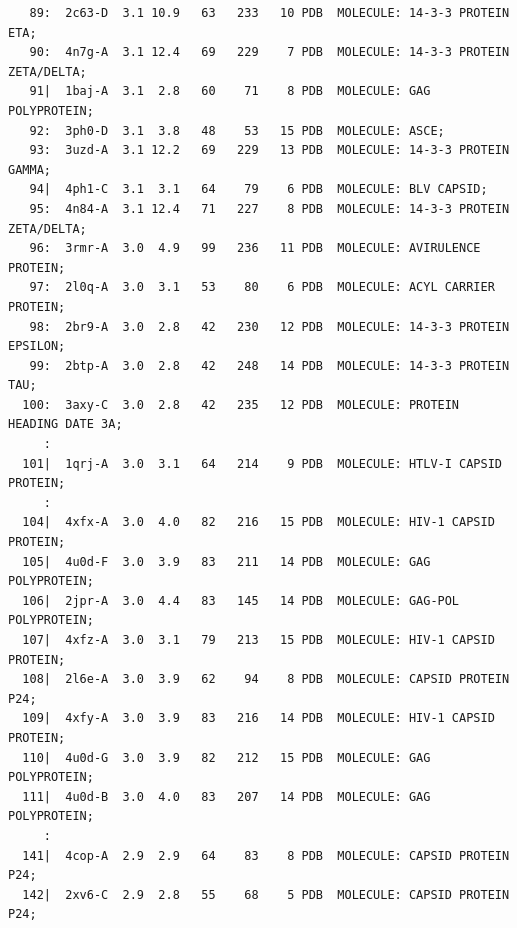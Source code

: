 \documentclass{bmcart}
\begin{document}
\begin{verbatim}
   89:  2c63-D  3.1 10.9   63   233   10 PDB  MOLECULE: 14-3-3 PROTEIN ETA;                                        
   90:  4n7g-A  3.1 12.4   69   229    7 PDB  MOLECULE: 14-3-3 PROTEIN ZETA/DELTA;                                 
   91|  1baj-A  3.1  2.8   60    71    8 PDB  MOLECULE: GAG POLYPROTEIN;                                           
   92:  3ph0-D  3.1  3.8   48    53   15 PDB  MOLECULE: ASCE;                                                      
   93:  3uzd-A  3.1 12.2   69   229   13 PDB  MOLECULE: 14-3-3 PROTEIN GAMMA;                                      
   94|  4ph1-C  3.1  3.1   64    79    6 PDB  MOLECULE: BLV CAPSID;                                                
   95:  4n84-A  3.1 12.4   71   227    8 PDB  MOLECULE: 14-3-3 PROTEIN ZETA/DELTA;                                 
   96:  3rmr-A  3.0  4.9   99   236   11 PDB  MOLECULE: AVIRULENCE PROTEIN;                                        
   97:  2l0q-A  3.0  3.1   53    80    6 PDB  MOLECULE: ACYL CARRIER PROTEIN;                                      
   98:  2br9-A  3.0  2.8   42   230   12 PDB  MOLECULE: 14-3-3 PROTEIN EPSILON;                                    
   99:  2btp-A  3.0  2.8   42   248   14 PDB  MOLECULE: 14-3-3 PROTEIN TAU;                                        
  100:  3axy-C  3.0  2.8   42   235   12 PDB  MOLECULE: PROTEIN HEADING DATE 3A;                                   
     :
  101|  1qrj-A  3.0  3.1   64   214    9 PDB  MOLECULE: HTLV-I CAPSID PROTEIN;                                     
     :
  104|  4xfx-A  3.0  4.0   82   216   15 PDB  MOLECULE: HIV-1 CAPSID PROTEIN;                                      
  105|  4u0d-F  3.0  3.9   83   211   14 PDB  MOLECULE: GAG POLYPROTEIN;                                           
  106|  2jpr-A  3.0  4.4   83   145   14 PDB  MOLECULE: GAG-POL POLYPROTEIN;                                       
  107|  4xfz-A  3.0  3.1   79   213   15 PDB  MOLECULE: HIV-1 CAPSID PROTEIN;                                      
  108|  2l6e-A  3.0  3.9   62    94    8 PDB  MOLECULE: CAPSID PROTEIN P24;                                        
  109|  4xfy-A  3.0  3.9   83   216   14 PDB  MOLECULE: HIV-1 CAPSID PROTEIN;                                      
  110|  4u0d-G  3.0  3.9   82   212   15 PDB  MOLECULE: GAG POLYPROTEIN;                                           
  111|  4u0d-B  3.0  4.0   83   207   14 PDB  MOLECULE: GAG POLYPROTEIN;                                           
     :
  141|  4cop-A  2.9  2.9   64    83    8 PDB  MOLECULE: CAPSID PROTEIN P24;                                        
  142|  2xv6-C  2.9  2.8   55    68    5 PDB  MOLECULE: CAPSID PROTEIN P24;                                        

\end{verbatim}
\end{document}
